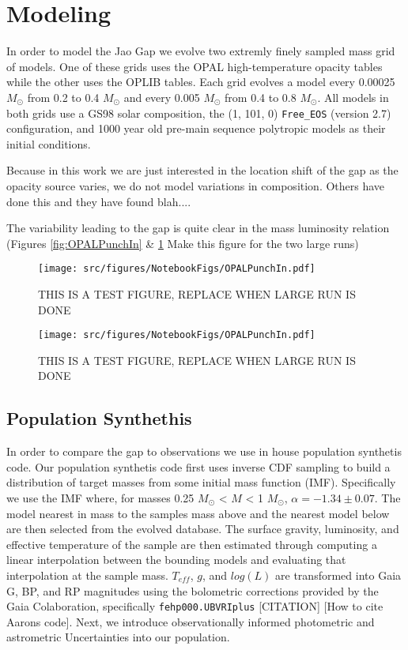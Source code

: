 \section{Modeling}\label{sec:modeling}
In order to model the Jao Gap we evolve two extremly finely sampled mass grid
of models. One of these grids uses the OPAL high-temperature opacity tables
while the other uses the OPLIB tables. Each grid evolves a model every 0.00025
$M_{\odot}$ from 0.2 to 0.4 $M_{\odot}$ and every 0.005 $M_{\odot}$ from 0.4 to
0.8 $M_{\odot}$. All models in both grids use a GS98 solar composition, the (1,
101, 0) \texttt{Free\_EOS} (version {\color{red}2.7}) configuration, and 1000
year old pre-main sequence polytropic models as their initial conditions.

Because in this work we are just interested in the location shift of the gap as
the opacity source varies, we do not model variations in composition.
{\color{red} Others have done this and they have found blah....}

The variability leading to the gap is quite clear in the mass luminosity
relation (Figures \ref{fig:OPALPunchIn} \& \ref{fig:OPLIBPunchIn}
{\color{red} Make this figure for the two large runs})

\begin{figure}
	\centering
	\texttt{[image: src/figures/NotebookFigs/OPALPunchIn.pdf]}
	\caption{{\color{red} THIS IS A TEST FIGURE, REPLACE WHEN LARGE RUN IS DONE}}
	\label{fig:OPALPunchIn}
	\texttt{[image: src/figures/NotebookFigs/OPALPunchIn.pdf]}
	\caption{{\color{red} THIS IS A TEST FIGURE, REPLACE WHEN LARGE RUN IS DONE}}
	\label{fig:OPLIBPunchIn}
		
\end{figure}

\subsection{Population Synthethis}
In order to compare the gap to observations we use in house population
synthetis code. Our population synthetis code first uses inverse CDF sampling
to build a distribution of target masses from some initial mass function (IMF).
Specifically we use the \citeauthor{Sollima2019} IMF where, for masses 0.25
$M_{\odot}$ < $M$ < 1 $M_{\odot}$, $\alpha=-1.34\pm0.07$. The model nearest in
mass to the samples mass above and the nearest model below are then selected
from the evolved database. The surface gravity, luminosity, and effective
temperature of the sample are then estimated through computing a linear
interpolation between the bounding models and evaluating that interpolation at
the sample mass. $T_{eff}$, $g$, and $log(L)$ are transformed into Gaia G, BP,
and RP magnitudes using the bolometric corrections provided by the Gaia
Colaboration, specifically \texttt{fehp000.UBVRIplus} {\color{red}[CITATION]}
{\color{red}[How to cite Aarons code]}. Next, we introduce observationally
informed photometric and astrometric Uncertainties into our population.

